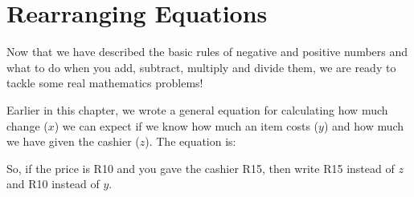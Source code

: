     \section{Rearranging Equations}
            \nopagebreak
      \label{m38346*id175988}Now that we have described the basic rules of negative and positive numbers and
what to do when you add, subtract, multiply and divide them, we are ready to
tackle some real mathematics problems!\par 
      \label{m38346*id175993}Earlier in this chapter, we wrote a general equation for calculating how much
change ($x$) we can expect if we know how much an item costs ($y$) and how much
we have given the cashier ($z$). The equation is:\par 
      \label{m38346*uid35}\nopagebreak\noindent{}
      \label{m38346*id176050}So, if the price is R10 and you gave the cashier R15, then write R15 instead of
$z$ and R10 instead of $y$.\par 
